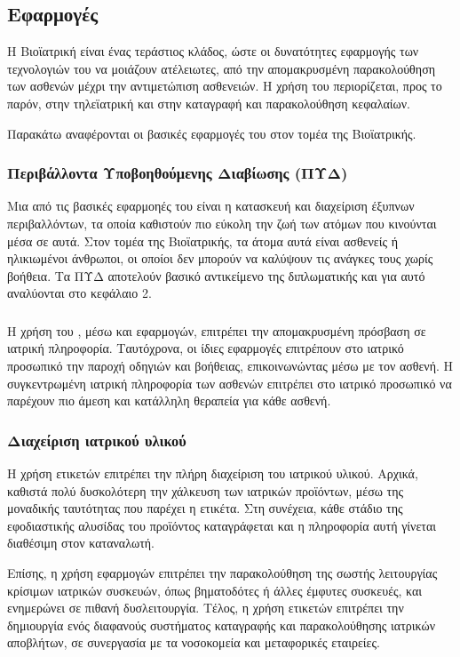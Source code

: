 \subsection{Εφαρμογές}
Η Βιοϊατρική είναι ένας τεράστιος κλάδος, ώστε οι δυνατότητες εφαρμογής των τεχνολογιών του  να μοιάζουν ατέλειωτες, από την απομακρυσμένη παρακολούθηση των ασθενών μέχρι την αντιμετώπιση ασθενειών.
Η χρήση του  περιορίζεται, προς το παρόν, στην τηλεϊατρική και στην καταγραφή και παρακολούθηση κεφαλαίων.
\par
Παρακάτω αναφέρονται οι βασικές εφαρμογές του  στον τομέα της Βιοϊατρικής.
\subsubsection{Περιβάλλοντα Υποβοηθούμενης Διαβίωσης (ΠΥΔ)}
Μια από τις βασικές εφαρμοηές του  είναι η κατασκευή και διαχείριση έξυπνων περιβαλλόντων, τα οποία καθιστούν πιο εύκολη την ζωή των ατόμων που κινούνται μέσα σε αυτά.
Στον τομέα της Βιοϊατρικής, τα άτομα αυτά είναι ασθενείς ή ηλικιωμένοι άνθρωποι, οι οποίοι δεν μπορούν να καλύψουν τις ανάγκες τους χωρίς βοήθεια.
Τα ΠΥΔ αποτελούν βασικό αντικείμενο της διπλωματικής και για αυτό αναλύονται στο κεφάλαιο 2.
\subsubsection{}
Η χρήση του , μέσω  και  εφαρμογών, επιτρέπει την απομακρυσμένη πρόσβαση σε ιατρική πληροφορία.
Ταυτόχρονα, οι ίδιες εφαρμογές επιτρέπουν στο ιατρικό προσωπικό την παροχή οδηγιών και βοήθειας, επικοινωνώντας μέσω  με τον ασθενή.
Η συγκεντρωμένη ιατρική πληροφορία των ασθενών επιτρέπει στο ιατρικό προσωπικό να παρέχουν πιο άμεση και κατάλληλη θεραπεία για κάθε ασθενή.
\subsubsection{Διαχείριση ιατρικού υλικού}
Η χρήση ετικετών  επιτρέπει την πλήρη διαχείριση του ιατρικού υλικού.
Αρχικά, καθιστά πολύ δυσκολότερη την χάλκευση των ιατρικών προϊόντων, μέσω της μοναδικής ταυτότητας που παρέχει η  ετικέτα.
Στη συνέχεια, κάθε στάδιο της εφοδιαστικής αλυσίδας του προϊόντος καταγράφεται και η πληροφορία αυτή γίνεται διαθέσιμη στον καταναλωτή.
\par
Επίσης, η χρήση εφαρμογών  επιτρέπει την παρακολούθηση της σωστής λειτουργίας κρίσιμων ιατρικών συσκευών, όπως βηματοδότες ή άλλες έμφυτες συσκευές, και ενημερώνει σε πιθανή δυσλειτουργία.
Τέλος, η χρήση ετικετών  επιτρέπει την δημιουργία ενός διαφανούς συστήματος καταγραφής και παρακολούθησης ιατρικών αποβλήτων, σε συνεργασία με τα νοσοκομεία και μεταφορικές εταιρείες. 
